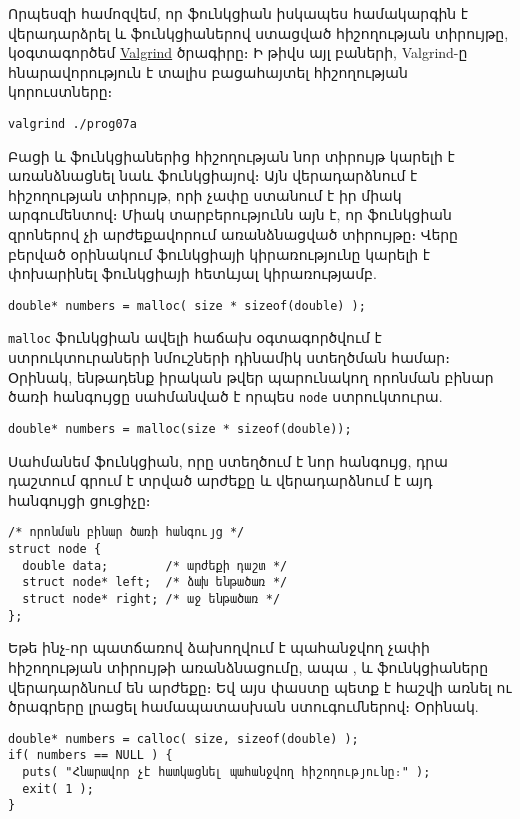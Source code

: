 Որպեսզի համոզվեմ, որ  ֆունկցիան իսկապես համակարգին է
վերադարձրել  և  ֆունկցիաներով ստացված
հիշողության տիրույթը, կօգտագործեմ \href{http://valgrind.org/}{Valgrind}
ծրագիրը։ Ի թիվս այլ բաների, Valgrind-ը հնարավորություն է տալիս
բացահայտել հիշողության կորուստները։

\begin{Verbatim}
valgrind ./prog07a
\end{Verbatim}

Բացի  և  ֆունկցիաներից հիշողության նոր
տիրույթ կարելի է առանձնացնել նաև  ֆունկցիայով։ Այն
վերադարձնում է հիշողության տիրույթ, որի չափը ստանում է իր միակ
արգումենտով։ Միակ տարբերությունն այն է, որ  ֆունկցիան
զրոներով չի արժեքավորում առանձնացված տիրույթը։ Վերը բերված օրինակում
 ֆունկցիայի կիրառությունը կարելի է փոխարինել
 ֆունկցիայի հետևյալ կիրառությամբ.

\begin{Verbatim}
double* numbers = malloc( size * sizeof(double) );
\end{Verbatim}

\texttt{malloc} ֆունկցիան ավելի հաճախ օգտագործվում է ստրուկտուրաների
նմուշների դինամիկ ստեղծման համար։ Օրինակ, ենթադենք իրական թվեր
պարունակող որոնման բինար ծառի հանգույցը սահմանված է որպես \texttt{node}
ստրուկտուրա.

\begin{Verbatim}
double* numbers = malloc(size * sizeof(double));
\end{Verbatim}

Սահմանեմ  ֆունկցիան, որը ստեղծում է նոր հանգույց,
դրա  դաշտում գրում է տրված արժեքը և վերադարձնում է այդ
հանգույցի ցուցիչը։

\begin{Verbatim}
/* որոնման բինար ծառի հանգույց */
struct node {
  double data;        /* արժեքի դաշտ */
  struct node* left;  /* ձախ ենթածառ */
  struct node* right; /* աջ ենթածառ */
};
\end{Verbatim}

Եթե ինչ-որ պատճառով ձախողվում է պահանջվող չափի հիշողության տիրույթի
առանձնացումը, ապա ,  և 
ֆունկցիաները վերադարձնում են  արժեքը։ Եվ այս փաստը պետք է
հաշվի առնել ու ծրագրերը լրացել համապատասխան ստուգումներով։ Օրինակ.

\begin{Verbatim}
double* numbers = calloc( size, sizeof(double) );
if( numbers == NULL ) {
  puts( "Հնարավոր չէ հատկացնել պահանջվող հիշողությունը։" );
  exit( 1 );
}
\end{Verbatim}
